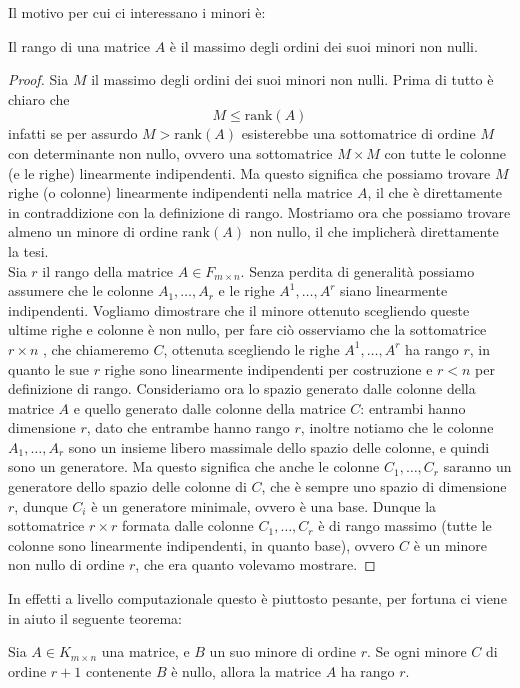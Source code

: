 \documentclass[11pt]{scrartcl}
\renewcommand{\rank}[1]{\text{rank}\!\left(#1\right)}
\begin{document}
   	 Il motivo per cui ci interessano i minori è:
   	 \begin{proposition}
   	 	Il rango di una matrice $A$ è il massimo degli ordini dei suoi minori non nulli.
   	 \end{proposition}
   	 \begin{proof}
   	 	Sia $M$ il massimo degli ordini dei suoi minori non nulli. Prima di tutto è chiaro che 
   	 	$$M\le \rank{A}$$
   	 	infatti se per assurdo $M>\rank{A}$ esisterebbe una sottomatrice di ordine $M$ con determinante non nullo, ovvero una sottomatrice $M\times M$ con tutte le colonne (e le righe) linearmente indipendenti. Ma questo significa che  possiamo trovare $M$ righe (o colonne) linearmente indipendenti nella matrice $A$, il che è direttamente in contraddizione con la definizione di rango. Mostriamo ora che possiamo trovare almeno un minore di ordine $\rank{A}$ non nullo, il che implicherà direttamente la tesi. \\
   	 	Sia $r$ il rango della matrice $A\in F_{m\times n}$. Senza perdita di generalità possiamo assumere che le colonne $A_1,\dots,A_r$ e le righe $A^1,\dots, A^r$ siano linearmente indipendenti. Vogliamo dimostrare che il minore ottenuto scegliendo queste ultime righe e colonne è non nullo, per fare ciò osserviamo che la sottomatrice $r\times n$ , che chiameremo $C$, ottenuta scegliendo le righe $A^1,\dots,A^r$ ha rango $r$, in quanto le sue $r$ righe sono linearmente indipendenti per costruzione e $r<n$ per definizione di rango. Consideriamo ora lo spazio generato dalle colonne della matrice $A$ e quello generato dalle colonne della matrice $C$: entrambi hanno dimensione $r$, dato che entrambe hanno rango $r$, inoltre notiamo che le colonne $A_1,\dots ,A_r$ sono un insieme libero massimale dello spazio delle colonne, e quindi sono un generatore. Ma questo significa che anche le colonne $C_1,\dots,C_r$ saranno un generatore dello spazio delle colonne di $C$, che è sempre uno spazio di dimensione $r$, dunque $C_i$ è un generatore minimale, ovvero è una base. Dunque la sottomatrice $r\times r$ formata dalle colonne $C_1,\dots,C_r$ è di rango massimo (tutte le colonne sono linearmente indipendenti, in quanto base), ovvero $C$ è un minore non nullo di ordine $r$, che era quanto volevamo mostrare.
   	 \end{proof}
   	 In effetti a livello computazionale questo è piuttosto pesante, per fortuna ci viene in aiuto il seguente teorema:
   	 \begin{theorem}
   	 	Sia $A\in K_{m\times n}$ una matrice, e $B$ un suo minore di ordine $r$. Se ogni minore $C$ di ordine $r+1$ contenente $B$ è nullo, allora la matrice $A$ ha rango $r$. 
   	 \end{theorem}
\end{document}
